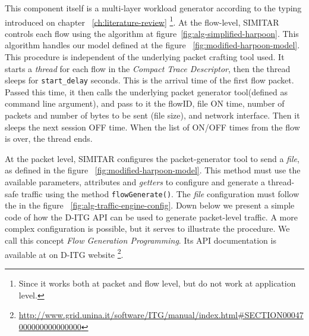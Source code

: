 This component itself is a multi-layer workload generator according to the typing introduced on chapter ~\ref{ch:literature-review} \footnote{Since it works both at packet and flow level, but do not work at application level.}. At the flow-level, SIMITAR controls each flow using the algorithm at figure~\ref{fig:alg-simplified-harpoon}. This algorithm handles our model defined at the figure ~\ref{fig:modified-harpoon-model}. This procedure is independent of the underlying packet crafting tool used. It starts a \textit{thread} for each flow in the \textit{Compact Trace Descriptor}, then the thread sleeps for \texttt{start\_delay} seconds. This is the arrival time of the first flow packet. Passed this time, it then calls the underlying packet generator tool(defined as command line argument), and pass to it the flowID, file ON time, number of packets and number of bytes to be sent (file size), and network interface. Then it sleeps the next session OFF time. When the list of ON/OFF times from the flow is over, the thread ends. 


At the packet level, SIMITAR configures the packet-generator tool to send a \textit{file}, as defined in the figure ~\ref{fig:modified-harpoon-model}. This method must use the available parameters, attributes and \textit{getters} to configure and generate a thread-safe traffic using the method \texttt{flowGenerate()}. The \textit{file} configuration must follow the in the figure ~\ref{fig:alg-traffic-engine-config}.  Down below we present a simple code of how the D-ITG API can be used to generate packet-level traffic. A more complex configuration is possible, but it serves to illustrate the procedure. We call this concept \textit{Flow Generation Programming}.  Its API documentation is available at on D-ITG website \footnote{\href{http://www.grid.unina.it/software/ITG/manual/index.html\#SECTION00047000000000000000}{http://www.grid.unina.it/software/ITG/manual/index.html\#SECTION00047000000000000000}}. 



